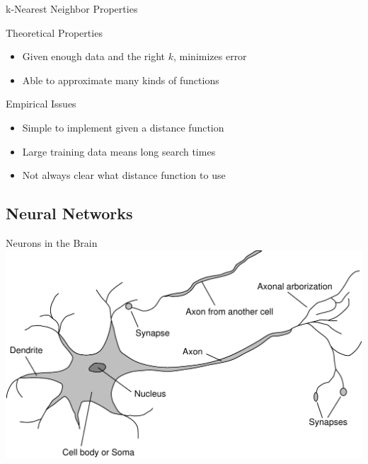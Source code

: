 \documentclass[14pt]{beamer}
\begin{document}
\begin{frame}[label=knn-properties]{k-Nearest Neighbor Properties}
\begin{block}{Theoretical Properties}
\begin{itemize}
\item Given enough data and the right $k$, minimizes error
\item Able to approximate many kinds of functions
\end{itemize}
\end{block}
\begin{block}{Empirical Issues}
\begin{itemize}
\item Simple to implement given a distance function
\item Large training data means long search times
\item Not always clear what distance function to use
\end{itemize}
\end{block}
\end{frame}


\subsection{Neural Networks}

\begin{frame}[label=brain-neuron]{Neurons in the Brain}
\includegraphics[width=\textwidth]{neuron}
\end{frame}
\end{document}
